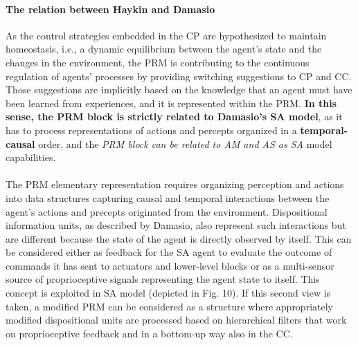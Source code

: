 \documentclass{article}
\begin{document}
		\paragraph{The relation between Haykin and Damasio}As the control strategies embedded in the CP are hypothesized to maintain homeostasis, i.e., a dynamic equilibrium between the agent’s state and the changes in the environment, the PRM is contributing to the continuous regulation of agents’ processes by providing switching suggestions to CP and CC. Those suggestions are implicitly based on the knowledge that an agent must have been learned from experiences, and it is represented within the PRM. \textbf{In this sense, the PRM block is strictly related to Damasio’s SA model}, as it has to process representations of actions and percepts organized in a \textbf{temporal-causal} order, and
		the \emph{PRM block can be related to AM and AS as SA} model capabilities.
		\paragraph{} The PRM elementary representation requires organizing perception and actions into data structures capturing causal and temporal interactions between the agent’s actions and precepts originated from the environment. Dispositional information units, as described by Damasio, also represent such interactions but are different because the state of the agent is directly observed by itself. This can be considered either as feedback for the SA agent to evaluate the outcome of commands it has sent to actuators and lower-level blocks or as a multi-sensor source of proprioceptive signals representing the agent state to itself. This concept is exploited in  \cite{regazzoni-2020-multi-sensorial-generative-and-descriptive-self-awareness-models-for-autonomous-systems} SA model (depicted in Fig. 10). If this second view is taken, a modified PRM can be considered as a structure where appropriately modified dispositional units are processed based
		on hierarchical filters that work on proprioceptive feedback and in a bottom-up way also in the CC. 
\end{document}
